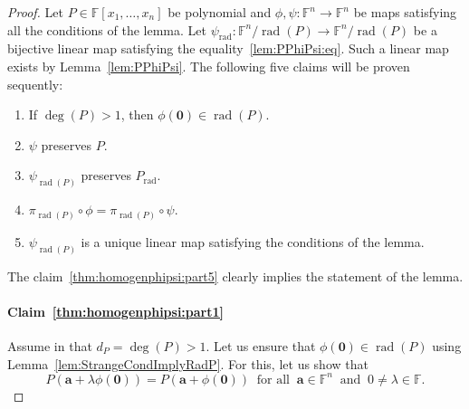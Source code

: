 \documentclass[10pt,a4paper]{amsart}
\def\F{{\mathbb F}}
\DeclareMathOperator{\rad}{rad}
\begin{document}
\begin{proof}Let $P \in \F[x_1,\ldots, x_n]$ be polynomial and $\phi, \psi\colon \F^n \to \F^n$ be maps satisfying all the conditions of the lemma.  Let $\psi_{\rad}\colon \F^n / \rad(P) \to \F^n / \rad(P)$ be a bijective linear map satisfying the equality~\eqref{lem:PPhiPsi:eq}. Such a linear map exists by Lemma~\eqref{lem:PPhiPsi}. The following five claims will be proven sequently:
\begin{enumerate}[label=(\roman*), ref=(\roman*)]
\item\label{thm:homogenphipsi:part1} If $\deg(P) > 1$, then $\phi(\mathbf 0) \in \rad(P)$.
\item\label{thm:homogenphipsi:part2} $\psi$ preserves $P$.
\item\label{thm:homogenphipsi:part3} $\psi_{\rad(P)}$ preserves $P_{\rad}$.
\item\label{thm:homogenphipsi:part4} $\pi_{\rad(P)} \circ \phi = \pi_{\rad(P)} \circ \psi$.
\item\label{thm:homogenphipsi:part5} $\psi_{\rad(P)}$ is a unique linear map satisfying the conditions of the lemma.
\end{enumerate}
The claim~\ref{thm:homogenphipsi:part5} clearly implies the statement of the lemma.
\paragraph{Claim~\ref{thm:homogenphipsi:part1}}%
Assume in that  $d_P = \deg(P) > 1$. Let us ensure that $\phi(\mathbf 0) \in \rad(P)$ using Lemma~\ref{lem:StrangeCondImplyRadP}. For this, let us show that
\begin{equation}\label{thm:homogenphipsi:eq77}
P(\mathbf a + \lambda \phi (\mathbf 0)) = P(\mathbf a + \phi (\mathbf 0))\;\;\mbox{for all}\;\;\mathbf a \in \F^n\;\;\mbox{and}\;\;0\neq \lambda \in \F.
\end{equation}


\end{proof}
\end{document}
